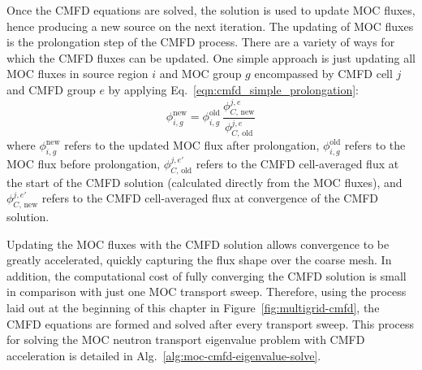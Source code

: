 Once the CMFD equations are solved, the solution is used to update MOC fluxes, hence producing a new source on the next iteration. The updating of MOC fluxes is the prolongation step of the CMFD process. There are a variety of ways for which the CMFD fluxes can be updated. One simple approach is just updating all MOC fluxes in source region $i$ and MOC group $g$ encompassed by CMFD cell $j$ and CMFD group $e$ by applying Eq.~\ref{eqn:cmfd_simple_prolongation}:
\begin{equation}
\phi_{i,g}^{\text{new}} = \phi_{i,g}^{\text{old}} \, \frac{\phi_{C, \, \text{new}}^{j,e}}{\phi_{C, \, \text{old}}^{j,e}}
\label{eqn:cmfd_simple_prolongation}
\end{equation}
where $\phi_{i,g}^{\text{new}}$ refers to the updated MOC flux after prolongation, $\phi_{i,g}^{\text{old}}$ refers to the MOC flux before prolongation, $\phi_{C, \, \text{old}}^{j,e'}$ refers to the CMFD cell-averaged flux at the start of the CMFD solution (calculated directly from the MOC fluxes), and $\phi_{C, \, \text{new}}^{j,e'}$ refers to the CMFD cell-averaged flux at convergence of the CMFD solution.

Updating the MOC fluxes with the CMFD solution allows convergence to be greatly accelerated, quickly capturing the flux shape over the coarse mesh. In addition, the computational cost of fully converging the CMFD solution is small in comparison with just one MOC transport sweep. Therefore, using the process laid out at the beginning of this chapter in Figure~\ref{fig:multigrid-cmfd}, the CMFD equations are formed and solved after every transport sweep. This process for solving the MOC neutron transport eigenvalue problem with CMFD acceleration is detailed in Alg.~\ref{alg:moc-cmfd-eigenvalue-solve}.

